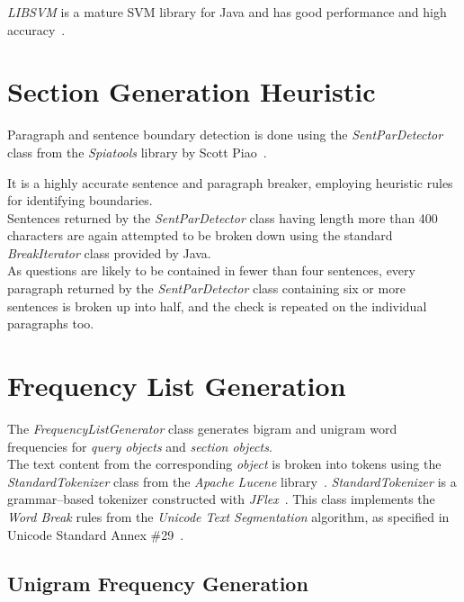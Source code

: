 \documentclass[a4paper,10pt]{report}
\begin{document}
\noindent \emph{LIBSVM} is a mature SVM library for Java and has good performance and high accuracy~\cite{libsvmpaper}.


\chapter{Section Generation Heuristic}

Paragraph and sentence boundary detection is done using the \emph{SentParDetector} class from the \emph{Spiatools} library by Scott Piao~\cite{spiatools}. 

It is a highly accurate sentence and paragraph breaker, employing heuristic rules for identifying boundaries. \\

\noindent Sentences returned by the \emph{SentParDetector} class having length more than 400 characters are again attempted to be broken 
down using the standard \emph{BreakIterator} class provided by Java.  \\

\noindent As questions are likely to be contained in fewer than four sentences, every paragraph returned by the \emph{SentParDetector}
class containing six or more sentences is broken up into half, and the check is repeated on the individual paragraphs too.


\chapter{Frequency List Generation}

The \emph{FrequencyListGenerator} class generates bigram and unigram word frequencies for \emph{query objects} and \emph{section objects}. \\

\noindent The text content from the corresponding \emph{object} is broken into tokens using the \emph{StandardTokenizer} class from the \emph{Apache Lucene} library~\cite{apachelucene}. 
\emph{StandardTokenizer} is a grammar--based tokenizer constructed with \emph{JFlex}~\cite{jflex}. 
This class implements the \emph{Word Break} rules from the\emph{ Unicode Text Segmentation} algorithm, as specified in Unicode Standard Annex \#29~\cite{unicode}.

\section{Unigram Frequency Generation}
\end{document}
